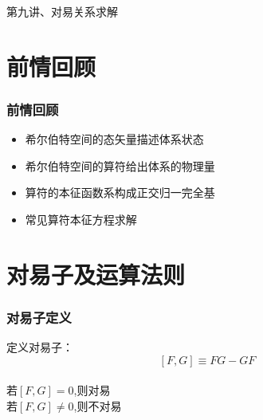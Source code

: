 \begin{frame}
    \frametitle{}
    \begin{center}
    { {\huge 第九讲、对易关系求解}}
    \end{center}    
\end{frame}


\section{前情回顾}

\begin{frame}
    \frametitle{前情回顾}
    \begin{itemize}
        \item 希尔伯特空间的态矢量描述体系状态
        \item 希尔伯特空间的算符给出体系的物理量
        \item 算符的本征函数系构成正交归一完全基
        \item 常见算符本征方程求解
    \end{itemize}   
\end{frame} 

\section{对易子及运算法则}
\begin{frame} 
    \frametitle{对易子定义}
    \begin{definition}
        定义对易子：$$ [F,G]\equiv FG-GF $$ \\
        若$[F,G]=0$,则对易 \\
        若$[F,G]\neq0$,则不对易
    \end{definition}
\end{frame} 

